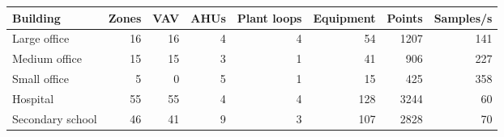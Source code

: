 \begin{tabular}{lrrrrrrr}
\toprule
Building & Zones & VAV & AHUs & Plant loops & Equipment & Points & Samples/s \\
\midrule
Large office & 16 & 16 & 4 & 4 & 54 & 1207 & 141 \\
Medium office & 15 & 15 & 3 & 1 & 41 & 906 & 227 \\
Small office & 5 & 0 & 5 & 1 & 15 & 425 & 358 \\
Hospital & 55 & 55 & 4 & 4 & 128 & 3244 & 60 \\
Secondary school & 46 & 41 & 9 & 3 & 107 & 2828 & 70 \\
\bottomrule
\end{tabular}